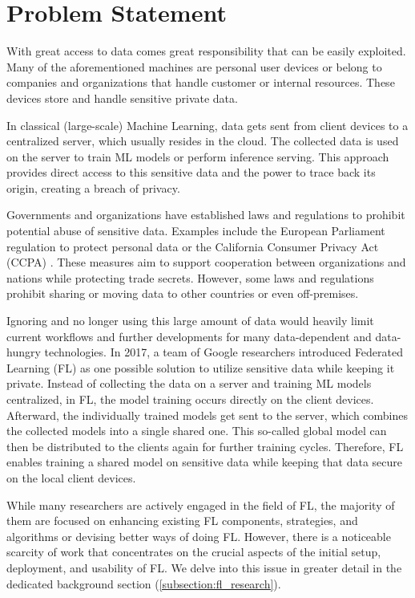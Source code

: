 \section{Problem Statement}

With great access to data comes great responsibility that can be easily exploited.
Many of the aforementioned machines are personal user devices or belong to
companies and organizations that handle customer or internal resources.
These devices store and handle sensitive private data.

In classical (large-scale) Machine Learning, data gets sent from client devices to a centralized server, which usually resides in the cloud.
The collected data is used on the server to train ML models or perform inference serving.
This approach provides direct access to this sensitive data and the power to trace back its origin,
creating a breach of privacy. \cite{book:fl}

Governments and organizations have established laws and regulations to prohibit
potential abuse of sensitive data.
Examples include the European Parliament regulation to protect personal data \cite{eu_regulation}
or the California Consumer Privacy Act (CCPA) \cite{california_consumer_privacy_act}.
These measures aim to support cooperation between organizations and nations while protecting trade secrets.
However, some laws and regulations prohibit sharing or moving data to other countries or even off-premises. \cite{book:fl}

Ignoring and no longer using this large amount of data would heavily limit current workflows
and further developments for many data-dependent and data-hungry technologies.
In 2017, a team of Google researchers introduced Federated Learning (FL)
as one possible solution to utilize sensitive data while keeping it private.
Instead of collecting the data on a server and training ML models centralized,
in FL, the model training occurs directly on the client devices.
Afterward, the individually trained models get sent to the server,
which combines the collected models into a single shared one.
This so-called global model can then be distributed to the clients again for further training cycles.
Therefore, FL enables training a shared model on sensitive data
while keeping that data secure on the local client devices. \cite{paper:original_fl}

While many researchers are actively engaged in the field of FL,
the majority of them are focused on enhancing existing FL components,
strategies, and algorithms or devising better ways of doing FL.
However, there is a noticeable scarcity of work that concentrates
on the crucial aspects of the initial setup, deployment, and usability of FL.
We delve into this issue in greater detail
in the dedicated background section (\ref{subsection:fl_research}).


